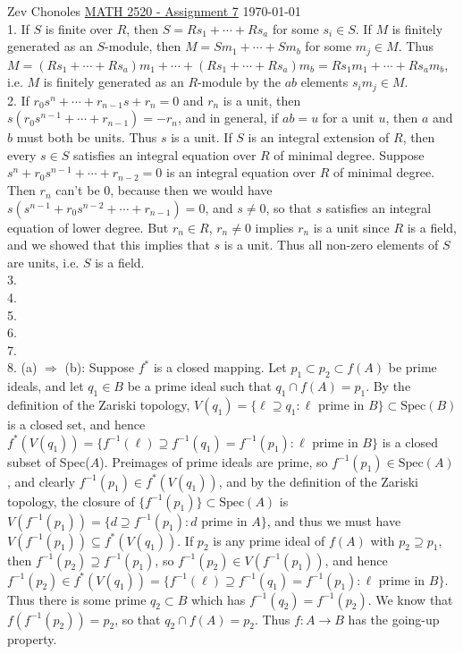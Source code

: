 \documentclass[11pt]{article}
\begin{document}
Zev Chonoles \hfill 
\underline{MATH 2520 - Assignment 7} \hfill \today\\

\num{1.} If $S$ is finite over $R$, then $S=Rs_1+\cdots+Rs_a$ for some $s_i\in S$. If $M$ is finitely generated as an $S$-module, then $M=Sm_1+\cdots+Sm_b$ for some $m_j\in M$. Thus $M=(Rs_1+\cdots+Rs_a)m_1+\cdots+(Rs_1+\cdots+Rs_a)m_b=Rs_1m_1+\cdots+Rs_am_b$, i.e. $M$ is finitely generated as an $R$-module by the $ab$ elements $s_im_j\in M$.      \\

\num{2.} If $r_0s^n+\cdots+r_{n-1}s+r_n=0$ and $r_n$ is a unit, then $s(r_0s^{n-1}+\cdots+r_{n-1})=-r_n$, and in general, if $ab=u$ for a unit $u$, then $a$ and $b$ must both be units. Thus $s$ is a unit. If $S$ is an integral extension of $R$, then every $s\in S$ satisfies an integral equation over $R$ of minimal degree. Suppose $s^n+r_0s^{n-1}+\cdots+r_{n-2}=0$ is an integral equation over $R$ of minimal degree. Then $r_n$ can't be 0, because then we would have $s(s^{n-1}+r_0s^{n-2}+\cdots+r_{n-1})=0$, and $s\neq 0$, so that $s$ satisfies an integral equation of lower degree. But $r_n\in R$, $r_n\neq 0$ implies $r_n$ is a unit since $R$ is a field, and we showed that this implies that $s$ is a unit. Thus all non-zero elements of $S$ are units, i.e. $S$ is a field.       \\

\num{3.}       \\

\num{4.}       \\

\num{5.}       \\

\num{6.}       \\

\num{7.}       \\

\num{8.} (a) $\Rightarrow$ (b): Suppose $f^*$ is a closed mapping. Let $p_1\subset p_2\subset f(A)$ be prime ideals, and let $q_1\in B$ be a prime ideal such that $q_1\cap f(A)=p_1$. By the definition of the Zariski topology, $V(q_1)=\{\ell\supseteq q_1:\ell\text{ prime in }B\}\subset\text{Spec}(B)$ is a closed set, and hence $f^*(V(q_1))=\{f^{-1}(\ell)\supseteq f^{-1}(q_1)=f^{-1}(p_1):\ell\text{ prime in }B\}$ is a closed subset of Spec($A$). Preimages of prime ideals are prime, so $f^{-1}(p_1)\in\text{Spec}(A)$, and clearly $f^{-1}(p_1)\in f^*(V(q_1))$, and by the definition of the Zariski topology, the closure of $\{f^{-1}(p_1)\}\subset\text{Spec}(A)$ is $V(f^{-1}(p_1))=\{d\supseteq f^{-1}(p_1):d\text{ prime in }A\}$, and thus we must have $V(f^{-1}(p_1))\subseteq f^*(V(q_1))$. If $p_2$ is any prime ideal of $f(A)$ with $p_2\supseteq p_1$, then $f^{-1}(p_2)\supseteq f^{-1}(p_1)$, so $f^{-1}(p_2)\in  V(f^{-1}(p_1))$, and hence $f^{-1}(p_2)\in f^*(V(q_1))=\{f^{-1}(\ell)\supseteq f^{-1}(q_1)=f^{-1}(p_1):\ell\text{ prime in }B\}$. Thus there is some prime $q_2\subset B$ which has $f^{-1}(q_2)=f^{-1}(p_2)$. We know that $f(f^{-1}(p_2))=p_2$, so that $q_2\cap f(A)=p_2$. Thus $f:A\rightarrow B$ has the going-up property.\\
\end{document}
